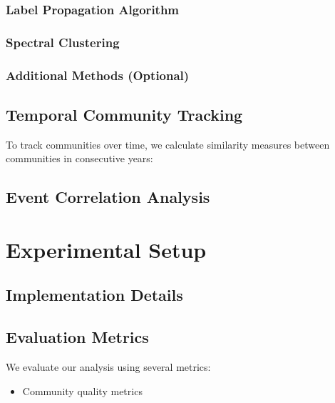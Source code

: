 \documentclass{article}
\begin{document}
\subsubsection{Label Propagation Algorithm}

\subsubsection{Spectral Clustering}

\subsubsection{Additional Methods (Optional)}

\subsection{Temporal Community Tracking}
To track communities over time, we calculate similarity measures between communities in consecutive years:

\subsection{Event Correlation Analysis}

\section{Experimental Setup}
\subsection{Implementation Details}

\subsection{Evaluation Metrics}
We evaluate our analysis using several metrics:
\begin{itemize}
    \item Community quality metrics 
\end{itemize}




\end{document}
